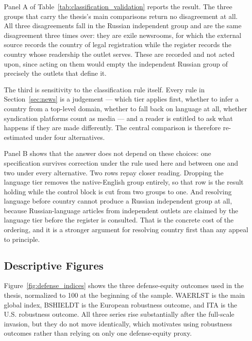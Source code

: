 \documentclass[12pt,a4paper]{article}
\begin{document}
Panel A of Table~\ref{tab:classification_validation} reports the result. The three groups that carry the thesis's main comparisons return no disagreement at all. All three disagreements fall in the Russian independent group and are the same disagreement three times over: they are exile newsrooms, for which the external source records the country of legal registration while the register records the country whose readership the outlet serves. These are recorded and not acted upon, since acting on them would empty the independent Russian group of precisely the outlets that define it.

The third is sensitivity to the classification rule itself. Every rule in Section~\ref{sec:news} is a judgement --- which tier applies first, whether to infer a country from a top-level domain, whether to fall back on language at all, whether syndication platforms count as media --- and a reader is entitled to ask what happens if they are made differently. The central comparison is therefore re-estimated under four alternatives.



Panel B shows that the answer does not depend on these choices: one specification survives correction under the rule used here and between one and two under every alternative. Two rows repay closer reading. Dropping the language tier removes the native-English group entirely, so that row is the result holding while the control block is cut from two groups to one. And resolving language before country cannot produce a Russian independent group at all, because Russian-language articles from independent outlets are claimed by the language tier before the register is consulted. That is the concrete cost of the ordering, and it is a stronger argument for resolving country first than any appeal to principle.

\subsection{Descriptive Figures}

Figure~\ref{fig:defense_indices} shows the three defense-equity outcomes used in the thesis, normalized to 100 at the beginning of the sample. WAERLST is the main global index, BSHIELDT is the European robustness outcome, and ITA is the U.S. robustness outcome. All three series rise substantially after the full-scale invasion, but they do not move identically, which motivates using robustness outcomes rather than relying on only one defense-equity proxy.
\end{document}
